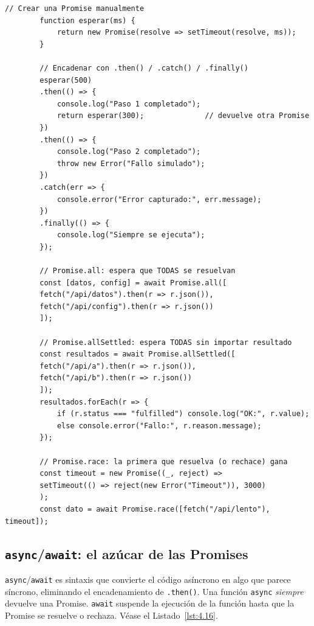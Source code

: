 \documentclass[11pt,a4paper,openany]{book}
\begin{document}
	\begin{lstlisting}[style=js,caption={Crear y encadenar Promises},label=lst:4.15]
		// Crear una Promise manualmente
		function esperar(ms) {
			return new Promise(resolve => setTimeout(resolve, ms));
		}
		
		// Encadenar con .then() / .catch() / .finally()
		esperar(500)
		.then(() => {
			console.log("Paso 1 completado");
			return esperar(300);              // devuelve otra Promise
		})
		.then(() => {
			console.log("Paso 2 completado");
			throw new Error("Fallo simulado");
		})
		.catch(err => {
			console.error("Error capturado:", err.message);
		})
		.finally(() => {
			console.log("Siempre se ejecuta");
		});
		
		// Promise.all: espera que TODAS se resuelvan
		const [datos, config] = await Promise.all([
		fetch("/api/datos").then(r => r.json()),
		fetch("/api/config").then(r => r.json())
		]);
		
		// Promise.allSettled: espera TODAS sin importar resultado
		const resultados = await Promise.allSettled([
		fetch("/api/a").then(r => r.json()),
		fetch("/api/b").then(r => r.json())
		]);
		resultados.forEach(r => {
			if (r.status === "fulfilled") console.log("OK:", r.value);
			else console.error("Fallo:", r.reason.message);
		});
		
		// Promise.race: la primera que resuelva (o rechace) gana
		const timeout = new Promise((_, reject) =>
		setTimeout(() => reject(new Error("Timeout")), 3000)
		);
		const dato = await Promise.race([fetch("/api/lento"), timeout]);
	\end{lstlisting}
	
	\subsection{\texttt{async}/\texttt{await}: el azúcar de las Promises}
	\label{sub:4.asyncawait}
	
	\texttt{async}/\texttt{await} es sintaxis que convierte el
	código asíncrono en algo que parece síncrono, eliminando el
	encadenamiento de \texttt{.then()}. Una función \texttt{async}
	\emph{siempre} devuelve una Promise. \texttt{await} suspende la
	ejecución de la función hasta que la Promise se resuelve o
	rechaza. Véase el Listado~\ref{lst:4.16}.
	
\end{document}
